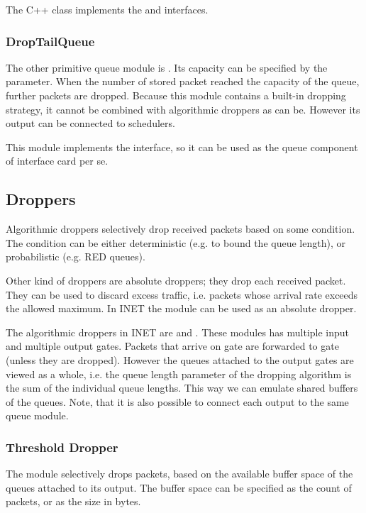 The C++ class implements the  and
 interfaces.

\subsubsection{DropTailQueue}

The other primitive queue module is .
Its capacity can be specified by the 
parameter. When the number of stored packet reached the capacity
of the queue, further packets are dropped.
Because this module contains a built-in dropping strategy, it
cannot be combined with algorithmic droppers as 
can be. However its output can be connected to schedulers.

This module implements the  interface,
so it can be used as the queue component of interface card per se.

\subsection{Droppers}

Algorithmic droppers selectively drop received packets based on some condition.
The condition can be either deterministic (e.g. to bound the queue length),
or probabilistic (e.g. RED queues).

Other kind of droppers are absolute droppers; they drop each received
packet. They can be used to discard excess traffic, i.e. packets whose
arrival rate exceeds the allowed maximum. In INET the 
module can be used as an absolute dropper.

The algorithmic droppers in INET are  and
. These modules has multiple input and multiple
output gates. Packets that arrive on gate  are forwarded
to gate  (unless they are dropped). However the queues
attached to the output gates are viewed as a whole, i.e. the queue
length parameter of the dropping algorithm is the sum of the individual
queue lengths. This way we can emulate shared buffers of the queues.
Note, that it is also possible to connect each output to the same
queue module.

\subsubsection{Threshold Dropper}

The  module selectively drops packets,
based on the available buffer space of the queues attached to its output.
The buffer space can be specified as the count of packets, or as the size
in bytes.

